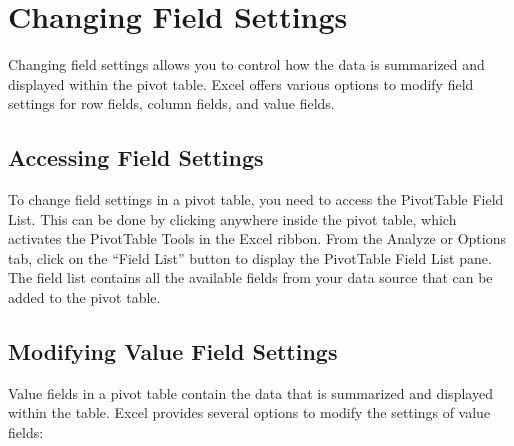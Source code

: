 \documentclass[
]{book}
\begin{document}
\hypertarget{changing-field-settings}{%
\section{Changing Field Settings}\label{changing-field-settings}}

Changing field settings allows you to control how the data is summarized and displayed within the pivot table. Excel offers various options to modify field settings for row fields, column fields, and value fields.

\hypertarget{accessing-field-settings}{%
\subsection{Accessing Field Settings}\label{accessing-field-settings}}

To change field settings in a pivot table, you need to access the PivotTable Field List. This can be done by clicking anywhere inside the pivot table, which activates the PivotTable Tools in the Excel ribbon. From the Analyze or Options tab, click on the ``Field List'' button to display the PivotTable Field List pane. The field list contains all the available fields from your data source that can be added to the pivot table.

\hypertarget{modifying-value-field-settings}{%
\subsection{Modifying Value Field Settings}\label{modifying-value-field-settings}}

Value fields in a pivot table contain the data that is summarized and displayed within the table. Excel provides several options to modify the settings of value fields:
\end{document}
